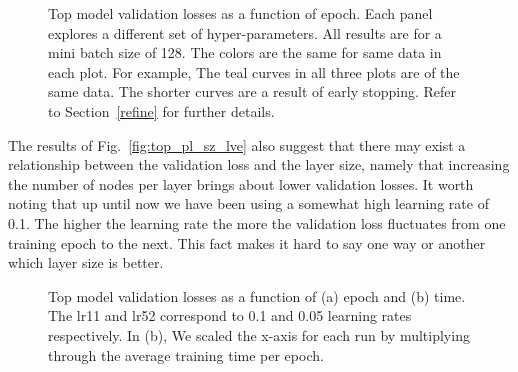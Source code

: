 \documentclass[12pt,journal,compsoc]{IEEEtran}
\begin{document}
\begin{figure}
\caption{Top model validation losses as a function of epoch. Each panel explores a different set of hyper-parameters. All results are for a mini batch size of 128. The colors are the same for same data in each plot.  For example, The teal curves in all three plots are of the same data. The shorter curves are a result of early stopping. Refer to Section~\ref{refine} for further details.}
\label{fig:top2_nl_sz_lr}
\vspace*{4pt}
\end{figure}

The results of Fig.~\ref{fig:top_pl_sz_lve} also suggest that there may exist a relationship between the validation loss and the layer size, namely that increasing the number of nodes per layer brings about lower validation losses. It worth noting that up until now we have been using a somewhat high learning rate of 0.1. The higher the learning rate the more the validation loss fluctuates from one training epoch to the next. This fact makes it hard to say one way or another which layer size is better. 

\begin{figure}%
\caption{Top model validation losses as a function of (a) epoch and (b) time. The lr11 and lr52 correspond to 0.1 and 0.05 learning rates respectively.  In (b), We scaled the x-axis for each run by multiplying through the average training time per epoch.}
\label{fig:top3_lr_bs}
\vspace*{4pt}
\end{figure}
\end{document}
